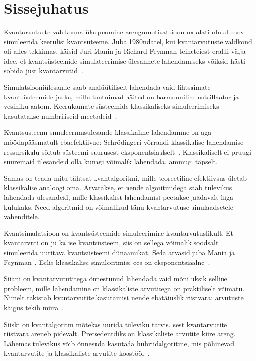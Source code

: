 \documentclass[12pt]{report}
\begin{document}
\tableofcontents


\chapter{Sissejuhatus}

Kvantarvutuste valdkonna üks peamine arengumotivatsioon on alati olnud soov simuleerida keerulisi kvantsüteeme.
Juba 1980ndatel, kui kvantarvutuste valdkond oli alles tekkimas, käisid Juri Manin ja Richard Feynman teineteiest eraldi välja idee, et kvantsüsteemide simulateerimise ülesannete lahendamiseks võiksid hästi sobida just kvantarvutid~\cite{manin, feynman}.

Simulatsiooniülesande saab analüütiliselt lahendada vaid lihtsaimate kvantsüsteemide jaoks, mille tuntuimad näited on harmooniline ostsillaator ja vesiniku aatom.
Keerukamate süsteemide klassikaliseks simuleerimiseks kasutatakse numbriliseid meetodeid~\cite{whitfield+etal2011, szabo+ostlund}.

Kvantsüsteemi simuleerimisülesande klassikaline lahendamine on aga möödapääsmatult ebaefektiivne: Schrödingeri võrrandi klassikalise lahendamise ressursikulu sõltub süsteemi suurusest eksponentsiaalselt~\cite{whitfield+etal2011, mcardle+etal, cao+etal, kassal+etal}.
Klassikaliselt ei pruugi suuremaid ülesandeid olla kunagi võimalik lahendada, ammugi täpselt.

Samas on teada mitu tähtsat kvantalgoritmi, mille teoreetiline efektiivsus ületab klassikalise analoogi oma.
Arvatakse, et nende algoritmidega saab tulevikus lahendada ülesandeid, mille klassikalist lahendamist peetakse jäädavalt liiga kulukaks.
Need algoritmid on võimalikud tänu kvantarvutuse ainulaadsetele vahenditele.

Kvantsimulatsioon on kvantsüsteemide simuleerimine kvantarvutuslikult.
Et kvantarvuti on ju ka ise kvantsüsteem, siis on sellega võimalik soodsalt simuleerida uuritava kvantsüsteemi dünaamikat.
Seda arvasid juba Manin ja Feynman~\cite{manin, feynman}.
Eelis klassikalise simuleerimise ees on eksponentsiaalne~\cite{whitfield+etal2011, mcardle+etal, cao+etal}.

Siiani on kvantarvututitega õnnestunud lahendada vaid mõni üksik selline probleem, mille lahendamine on klassikaliste arvutitega on praktiliselt võimatu.
Nimelt takistab kvantarvutite kasutamist nende ebatäiuslik riistvara: arvutuste käigus tekib müra~\cite{whitfield+etal2022}.

Siiski on kvantalgoritm mõtekas uurida tuleviku tarvis, sest kvantarvutite riistvara areneb pidevalt.
Pretsedentdiks on klassikaliste arvutite kiire areng.
Lähemas tulevikus võib õnnesuda kasutada hübriidalgoritme, mis põhinevad kvantarvutite ja klassikaliste arvutite koostööl~\cite{omalley+etal}.
\end{document}
